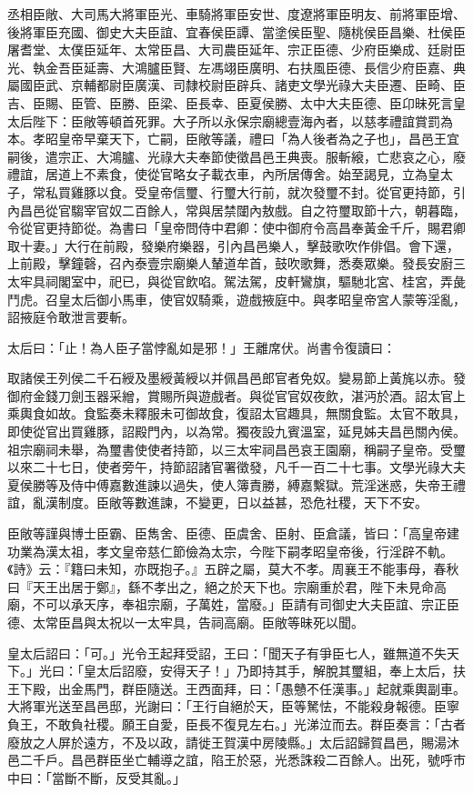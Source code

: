 \begin{pinyinscope}
丞相臣敞、大司馬大將軍臣光、車騎將軍臣安世、度遼將軍臣明友、前將軍臣增、後將軍臣充國、御史大夫臣誼、宜春侯臣譚、當塗侯臣聖、隨桃侯臣昌樂、杜侯臣屠耆堂、太僕臣延年、太常臣昌、大司農臣延年、宗正臣德、少府臣樂成、廷尉臣光、執金吾臣延壽、大鴻臚臣賢、左馮翊臣廣明、右扶風臣德、長信少府臣嘉、典屬國臣武、京輔都尉臣廣漢、司隸校尉臣辟兵、諸吏文學光祿大夫臣遷、臣畸、臣吉、臣賜、臣管、臣勝、臣梁、臣長幸、臣夏侯勝、太中大夫臣德、臣卬昧死言皇太后陛下：臣敞等頓首死罪。大子所以永保宗廟總壹海內者，以慈孝禮誼賞罰為本。孝昭皇帝早棄天下，亡嗣，臣敞等議，禮曰「為人後者為之子也」，昌邑王宜嗣後，遣宗正、大鴻臚、光祿大夫奉節使徵昌邑王典喪。服斬縗，亡悲哀之心，廢禮誼，居道上不素食，使從官略女子載衣車，內所居傳舍。始至謁見，立為皇太子，常私買雞豚以食。受皇帝信璽、行璽大行前，就次發璽不封。從官更持節，引內昌邑從官騶宰官奴二百餘人，常與居禁闥內敖戲。自之符璽取節十六，朝暮臨，令從官更持節從。為書曰「皇帝問侍中君卿：使中御府令高昌奉黃金千斤，賜君卿取十妻。」大行在前殿，發樂府樂器，引內昌邑樂人，擊鼓歌吹作俳倡。會下還，上前殿，擊鐘磬，召內泰壹宗廟樂人輦道牟首，鼓吹歌舞，悉奏眾樂。發長安廚三太牢具祠閣室中，祀已，與從官飲啗。駕法駕，皮軒鸞旗，驅馳北宮、桂宮，弄彘鬥虎。召皇太后御小馬車，使官奴騎乘，遊戲掖庭中。與孝昭皇帝宮人蒙等淫亂，詔掖庭令敢泄言要斬。

太后曰：「止！為人臣子當悖亂如是邪！」王離席伏。尚書令復讀曰：

取諸侯王列侯二千石綬及墨綬黃綬以并佩昌邑郎官者免奴。變易節上黃旄以赤。發御府金錢刀劍玉器采繒，賞賜所與遊戲者。與從官官奴夜飲，湛沔於酒。詔太官上乘輿食如故。食監奏未釋服未可御故食，復詔太官趣具，無關食監。太官不敢具，即使從官出買雞豚，詔殿門內，以為常。獨夜設九賓溫室，延見姊夫昌邑關內侯。祖宗廟祠未舉，為璽書使使者持節，以三太牢祠昌邑哀王園廟，稱嗣子皇帝。受璽以來二十七日，使者旁午，持節詔諸官署徵發，凡千一百二十七事。文學光祿大夫夏侯勝等及侍中傅嘉數進諫以過失，使人簿責勝，縛嘉繫獄。荒淫迷惑，失帝王禮誼，亂漢制度。臣敞等數進諫，不變更，日以益甚，恐危社稷，天下不安。

臣敞等謹與博士臣霸、臣雋舍、臣德、臣虞舍、臣射、臣倉議，皆曰：「高皇帝建功業為漢太祖，孝文皇帝慈仁節儉為太宗，今陛下嗣孝昭皇帝後，行淫辟不軌。《詩》云：『籍曰未知，亦既抱子。』五辟之屬，莫大不孝。周襄王不能事母，春秋曰『天王出居于鄭』，繇不孝出之，絕之於天下也。宗廟重於君，陛下未見命高廟，不可以承天序，奉祖宗廟，子萬姓，當廢。」臣請有司御史大夫臣誼、宗正臣德、太常臣昌與太祝以一太牢具，告祠高廟。臣敞等昧死以聞。

皇太后詔曰：「可。」光令王起拜受詔，王曰：「聞天子有爭臣七人，雖無道不失天下。」光曰：「皇太后詔廢，安得天子！」乃即持其手，解脫其璽組，奉上太后，扶王下殿，出金馬門，群臣隨送。王西面拜，曰：「愚戇不任漢事。」起就乘輿副車。大將軍光送至昌邑邸，光謝曰：「王行自絕於天，臣等駑怯，不能殺身報德。臣寧負王，不敢負社稷。願王自愛，臣長不復見左右。」光涕泣而去。群臣奏言：「古者廢放之人屏於遠方，不及以政，請徙王賀漢中房陵縣。」太后詔歸賀昌邑，賜湯沐邑二千戶。昌邑群臣坐亡輔導之誼，陷王於惡，光悉誅殺二百餘人。出死，號呼巿中曰：「當斷不斷，反受其亂。」


\end{pinyinscope}
